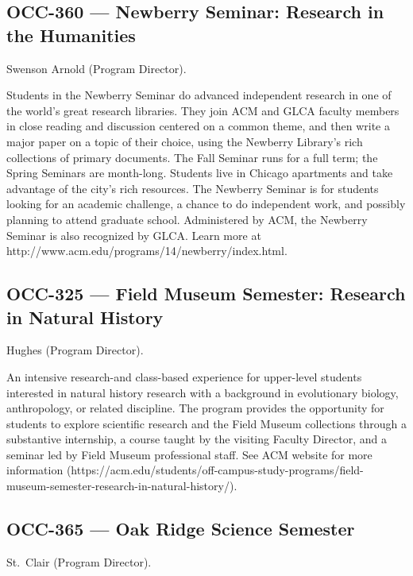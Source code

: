 \documentclass[
  letterpaper,
]{scrbook}
\begin{document}
\subsection{OCC-360 --- Newberry Seminar: Research in the
Humanities}\label{occ-360-newberry-seminar-research-in-the-humanities}

Swenson Arnold (Program Director).

Students in the Newberry Seminar do advanced independent research in one
of the world's great research libraries. They join ACM and GLCA faculty
members in close reading and discussion centered on a common theme, and
then write a major paper on a topic of their choice, using the Newberry
Library's rich collections of primary documents. The Fall Seminar runs
for a full term; the Spring Seminars are month-long. Students live in
Chicago apartments and take advantage of the city's rich resources. The
Newberry Seminar is for students looking for an academic challenge, a
chance to do independent work, and possibly planning to attend graduate
school. Administered by ACM, the Newberry Seminar is also recognized by
GLCA. Learn more at http://www.acm.edu/programs/14/newberry/index.html.

\subsection{OCC-325 --- Field Museum Semester: Research in Natural
History}\label{occ-325-field-museum-semester-research-in-natural-history}

Hughes (Program Director).

An intensive research-and class-based experience for upper-level
students interested in natural history research with a background in
evolutionary biology, anthropology, or related discipline. The program
provides the opportunity for students to explore scientific research and
the Field Museum collections through a substantive internship, a course
taught by the visiting Faculty Director, and a seminar led by Field
Museum professional staff. See ACM website for more information
(https://acm.edu/students/off-campus-study-programs/field-museum-semester-research-in-natural-history/).

\subsection{OCC-365 --- Oak Ridge Science
Semester}\label{occ-365-oak-ridge-science-semester}

St.~Clair (Program Director).
\end{document}
